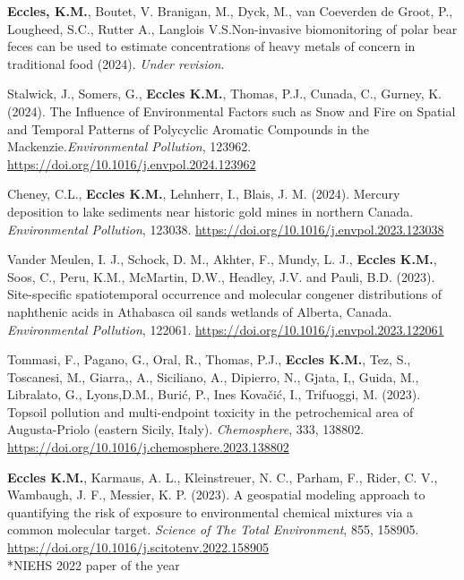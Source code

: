 \documentclass[margin,line]{res}
\begin{document}
\begin{resume}
\begin{etaremune}[start=26]

\item \textbf{Eccles, K.M.}, Boutet, V. Branigan, M., Dyck, M., van Coeverden de Groot, P., Lougheed, S.C., Rutter A., Langlois V.S.Non-invasive biomonitoring of polar bear feces can be used to estimate concentrations of heavy metals of concern in traditional food (2024). \textit{Under revision}.

\item Stalwick, J., Somers, G., \textbf{Eccles K.M.}, Thomas, P.J., Cunada, C., Gurney, K. (2024). The Influence of Environmental Factors such as Snow and Fire on Spatial and Temporal Patterns of Polycyclic Aromatic Compounds in the Mackenzie.\textit{Environmental Pollution}, 123962. \url{https://doi.org/10.1016/j.envpol.2024.123962}

\item Cheney, C.L., \textbf{Eccles K.M.}, Lehnherr, I., Blais, J. M. (2024). Mercury deposition to lake sediments near historic gold mines in northern Canada. \textit{Environmental Pollution}, 123038. \url{https://doi.org/10.1016/j.envpol.2023.123038}

\item Vander Meulen, I. J., Schock, D. M., Akhter, F., Mundy, L. J., \textbf{Eccles K.M.}, Soos, C., Peru, K.M., McMartin, D.W., Headley, J.V. and Pauli, B.D. (2023). Site-specific spatiotemporal occurrence and molecular congener distributions of naphthenic acids in Athabasca oil sands wetlands of Alberta, Canada. \textit{Environmental Pollution}, 122061. \url{https://doi.org/10.1016/j.envpol.2023.122061}

\item Tommasi, F., Pagano, G., Oral, R., Thomas, P.J., \textbf{Eccles K.M.}, Tez, S., Toscanesi, M., Giarra,, A., Siciliano, A., Dipierro, N., Gjata, I,, Guida, M., Libralato, G., Lyons,D.M., Burić, P., Ines Kovačić, I.,  Trifuoggi, M. (2023). Topsoil pollution and multi-endpoint toxicity in the petrochemical area of Augusta-Priolo (eastern Sicily, Italy). \textit{Chemosphere}, 333, 138802. \url{https://doi.org/10.1016/j.chemosphere.2023.138802}

\item \textbf{Eccles K.M.}, Karmaus, A. L., Kleinstreuer, N. C., Parham, F., Rider, C. V., Wambaugh, J. F., Messier, K. P. (2023). A geospatial modeling approach to quantifying the risk of exposure to environmental chemical mixtures via a common molecular target. \textit{Science of The Total Environment}, 855, 158905. \url{https://doi.org/10.1016/j.scitotenv.2022.158905}\\
\mbox{*}NIEHS 2022 paper of the year


\end{etaremune}
\end{resume}
\end{document}
